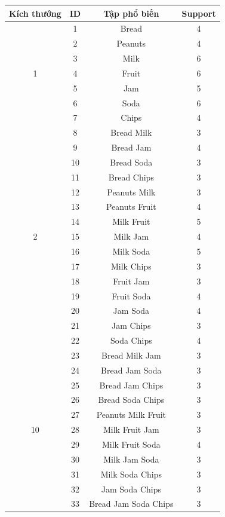 \documentclass{article}
\begin{document}
\begin{longtable}{c | c | c | c}

	Kích thướng & ID & Tập phổ biến  & Support \\ \hline
	\multirow{7}{*}{1} & 1 & Bread & 4 \\
	&2& Peanuts & 4 \\
	&3& Milk & 6 \\
	&4& Fruit & 6 \\
	&5& Jam & 5 \\
	&6& Soda & 6 \\
	&7& Chips & 4 \\ 
	\hline
	\multirow{15}{*}{2}&8& Bread Milk& 3\\
	&9& Bread Jam& 4\\
	&10& Bread Soda& 3\\
	&11& Bread Chips& 3\\
	&12& Peanuts Milk& 3\\
	&13& Peanuts Fruit& 4\\
	&14& Milk Fruit& 5\\
	&15& Milk Jam& 4\\
	&16& Milk Soda& 5\\
	&17& Milk Chips & 3\\
	&18& Fruit Jam& 3\\
	&19&Fruit Soda& 4\\
	&20&Jam Soda& 4\\
	&21& Jam Chips& 3\\
	&22& Soda Chips& 4\\ 
	\hline
	\multirow{15}{*}{10}&23&Bread Milk Jam& 3\\
	&24&Bread Jam Soda& 3\\
	&25&Bread Jam Chips& 3\\
	&26&Bread Soda Chips& 3\\
	&27&Peanuts Milk Fruit& 3\\
	&28&Milk Fruit Jam& 3\\
	&29&Milk Fruit Soda& 4\\
	&30&Milk Jam Soda& 3\\
	&31&Milk Soda Chips& 3\\
	&32&Jam Soda Chips& 3\\
	\hline
	4&33&Bread Jam Soda Chips& 3\\
	
\end{longtable}
\end{document}
